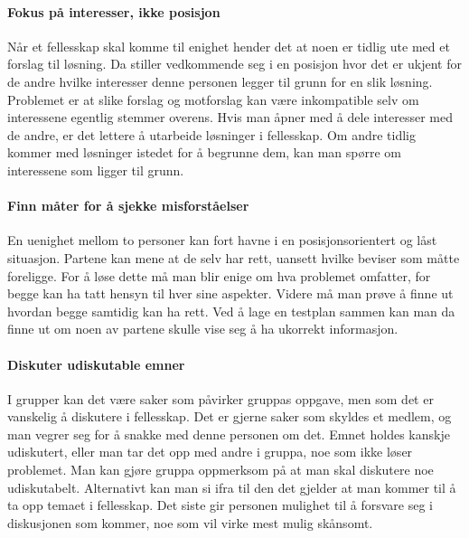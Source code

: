 \paragraph{Fokus på interesser, ikke posisjon}
Når et fellesskap skal komme til enighet hender det at noen er tidlig ute med et forslag til løsning.
Da stiller vedkommende seg i en posisjon hvor det er ukjent for de andre hvilke interesser denne personen legger til grunn for en slik løsning.
Problemet er at slike forslag og motforslag kan være inkompatible selv om interessene egentlig stemmer overens.
Hvis man åpner med å dele interesser med de andre, er det lettere å utarbeide løsninger i fellesskap.
Om andre tidlig kommer med løsninger istedet for å begrunne dem, kan man spørre om interessene som ligger til grunn.

\paragraph{}

\paragraph{Finn måter for å sjekke misforståelser}
En uenighet mellom to personer kan fort havne i en posisjonsorientert og låst situasjon.
Partene kan mene at de selv har rett, uansett hvilke beviser som måtte foreligge.
For å løse dette må man blir enige om hva problemet omfatter, for begge kan ha tatt hensyn til hver sine aspekter.
Videre må man prøve å finne ut hvordan begge samtidig kan ha rett.
Ved å lage en testplan sammen kan man da finne ut om noen av partene skulle vise seg å ha ukorrekt informasjon.

\paragraph{Diskuter udiskutable emner}
I grupper kan det være saker som påvirker gruppas oppgave, men som det er vanskelig å diskutere i fellesskap.
Det er gjerne saker som skyldes et medlem, og man vegrer seg for å snakke med denne personen om det.
Emnet holdes kanskje udiskutert, eller man tar det opp med andre i gruppa, noe som ikke løser problemet.
Man kan gjøre gruppa oppmerksom på at man skal diskutere noe udiskutabelt.
Alternativt kan man si ifra til den det gjelder at man kommer til å ta opp temaet i fellesskap.
Det siste gir personen mulighet til å forsvare seg i diskusjonen som kommer, noe som vil virke mest mulig skånsomt.

\paragraph{}